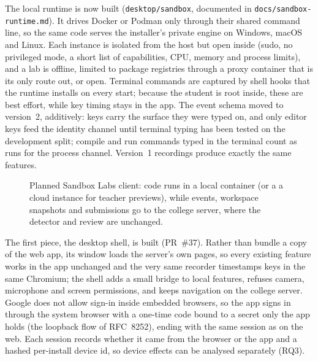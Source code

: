 The local runtime is now built (\texttt{desktop/sandbox}, documented in
\texttt{docs/sandbox-runtime.md}). It drives Docker or Podman only through
their shared command line, so the same code serves the installer's private
engine on Windows, macOS and Linux. Each instance is isolated from the host
but open inside (sudo, no privileged mode, a short list of capabilities, CPU,
memory and process limits), and a lab is offline, limited to package
registries through a proxy container that is its only route out, or open.
Terminal commands are captured by shell hooks that the runtime installs on
every start; because the student is root inside, these are best effort, while
key timing stays in the app. The event schema moved to version~2, additively:
keys carry the surface they were typed on, and only editor keys feed the
identity channel until terminal typing has been tested on the development
split; compile and run commands typed in the terminal count as runs for the
process channel. Version~1 recordings produce exactly the same features.

\begin{figure}[ht]
  \centering
  \caption{Planned Sandbox Labs client: code runs in a local container (or a
  a cloud instance for teacher previews), while events, workspace snapshots and submissions go
  to the college server, where the detector and review are unchanged.}
  \label{fig:desktop-client}
\end{figure}

The first piece, the desktop shell, is built (PR~\#37). Rather than bundle a
copy of the web app, its window loads the server's own pages, so every
existing feature works in the app unchanged and the very same recorder
timestamps keys in the same Chromium; the shell adds a small bridge to local
features, refuses camera, microphone and screen permissions, and keeps
navigation on the college server. Google does not allow sign-in inside
embedded browsers, so the app signs in through the system browser with a
one-time code bound to a secret only the app holds (the loopback flow of
RFC~8252), ending with the same session as on the web. Each session records
whether it came from the browser or the app and a hashed per-install device
id, so device effects can be analysed separately (RQ3).


